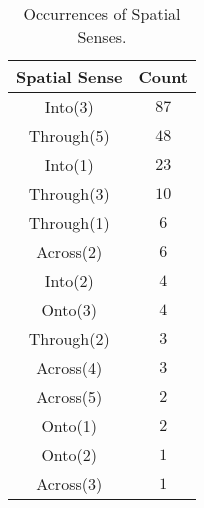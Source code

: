 \begin{longtable}{c c}
\caption{Occurrences of Spatial Senses.}
\label{tab:spatial_senses} \\
\midrule
\toprule
\textbf{Spatial Sense} & \textbf{Count} \\
\midrule
Into(3) & $87$ \\
Through(5) & $48$ \\
Into(1) & $23$ \\
Through(3) & $10$ \\
Through(1) & $6$ \\
Across(2) & $6$ \\
Into(2) & $4$ \\
Onto(3) & $4$ \\
Through(2) & $3$ \\
Across(4) & $3$ \\
Across(5) & $2$ \\
Onto(1) & $2$ \\
Onto(2) & $1$ \\
Across(3) & $1$ \\
\bottomrule
\midrule
\end{longtable}
